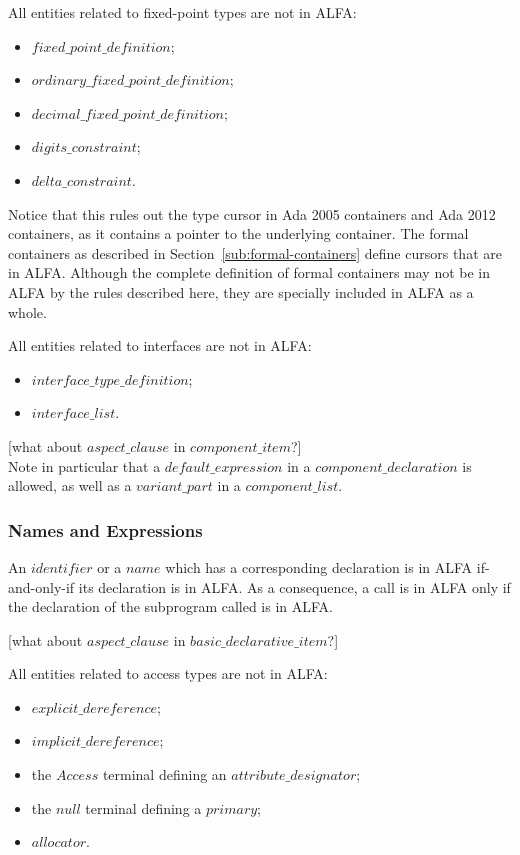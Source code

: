 \documentclass{article}
\newcommand{\bnf}[1]{$\mathit{#1}$}
\begin{document}
All entities related to fixed-point types are not in ALFA:
\begin{itemize}
\item \bnf{fixed\_point\_definition};
\item \bnf{ordinary\_fixed\_point\_definition};
\item \bnf{decimal\_fixed\_point\_definition};
\item \bnf{digits\_constraint};
\item \bnf{delta\_constraint}.
\end{itemize}

Notice that this rules out the type cursor in Ada 2005 containers and Ada 2012
containers, as it contains a pointer to the underlying container. The formal
containers as described in Section~\ref{sub:formal-containers} define cursors
that are in ALFA. Although the complete definition of formal containers may not
be in ALFA by the rules described here, they are specially included in ALFA as
a whole.

All entities related to interfaces are not in ALFA:
\begin{itemize}
\item \bnf{interface\_type\_definition};
\item \bnf{interface\_list}.
\end{itemize}

[what about \bnf{aspect\_clause} in \bnf{component\_item}?]\\

Note in particular that a \bnf{default\_expression} in a
\bnf{component\_declaration} is allowed, as well as a \bnf{variant\_part} in
a \bnf{component\_list}.

\subsubsection{Names and Expressions}

An \bnf{identifier} or a \bnf{name} which has a corresponding declaration is in
ALFA if-and-only-if its declaration is in ALFA. As a consequence, a call is in
ALFA only if the declaration of the subprogram called is in ALFA. 

[what about \bnf{aspect\_clause} in \bnf{basic\_declarative\_item}?]

All entities related to access types are not in ALFA:
\begin{itemize}
\item \bnf{explicit\_dereference};
\item \bnf{implicit\_dereference};
\item the \bnf{Access} terminal defining an \bnf{attribute\_designator};
\item the \bnf{null} terminal defining a \bnf{primary};
\item \bnf{allocator}.
\end{itemize}
\end{document}
